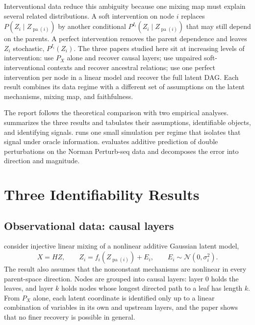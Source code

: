 \documentclass{article}
\newcommand{\pa}{\operatorname{pa}}
\begin{document}
Interventional data reduce this ambiguity because one mixing map must explain several related distributions. A soft intervention on node $i$ replaces $P(Z_i\mid Z_{\pa(i)})$ by another conditional $P^{I_i}(Z_i\mid Z_{\pa(i)})$ that may still depend on the parents. A perfect intervention removes the parent dependence and leaves $Z_i$ stochastic, $P^{I_i}(Z_i)$. The three papers studied here sit at increasing levels of intervention: \citet{welch2024observational} use $P_X$ alone and recover causal layers; \citet{zhang2023soft} use unpaired soft-interventional contexts and recover ancestral relations; \citet{squires2023linear} use one perfect intervention per node in a linear model and recover the full latent DAG. Each result combines its data regime with a different set of assumptions on the latent mechanisms, mixing map, and faithfulness.

The report follows the theoretical comparison with two empirical analyses.  summarizes the three results and tabulates their assumptions, identifiable objects, and identifying signals.  runs one small simulation per regime that isolates that signal under oracle information.  evaluates additive prediction of double perturbations on the Norman Perturb-seq data and decomposes the error into direction and magnitude. 

\section{Three Identifiability Results}
\label{sec:results}

\subsection{Observational data: causal layers}

\citet{welch2024observational} consider injective linear mixing of a nonlinear additive Gaussian latent model,
\begin{equation}
    X=HZ,
    \qquad
    Z_i=f_i(Z_{\pa(i)})+E_i,
    \qquad E_i\sim\mathcal N(0,\sigma_i^2).
    \label{eq:obs-model}
\end{equation}
The result also assumes that the nonconstant mechanisms are nonlinear in every parent-space direction. Nodes are grouped into causal layers: layer $0$ holds the leaves, and layer $k$ holds nodes whose longest directed path to a leaf has length $k$. From $P_X$ alone, each latent coordinate is identified only up to a linear combination of variables in its own and upstream layers, and the paper shows that no finer recovery is possible in general.
\end{document}
